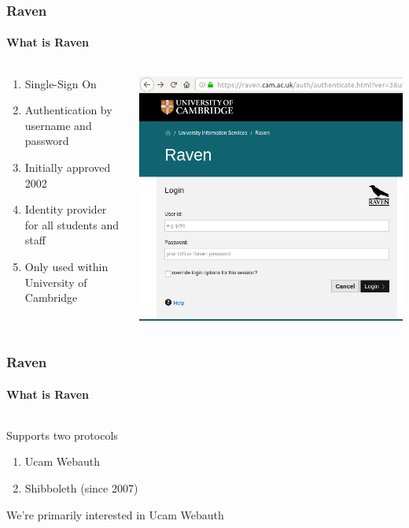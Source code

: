 \documentclass[handout, aspectratio=169, notes=hide]{beamer}
\begin{document}
\begin{frame}
\frametitle{Raven}
\framesubtitle{What is Raven}
\setlength{\parskip}{1.0em}
\centering
\begin{columns}[T]
\begin{column}[T]{0.5\textwidth}
\begin{enumerate}
\setlength{\parskip}{1.0em}
\item Single-Sign On
\item Authentication by username and password
\item Initially approved 2002
\item Identity provider for all students and staff
\item Only used within University of Cambridge
\end{enumerate}
\end{column}
\begin{column}[T]{0.5\textwidth}
\includegraphics[width=1.0\textwidth,right]{raven-login}
\end{column}
\end{columns}

\end{frame}
\note{
}


\begin{frame}
\frametitle{Raven}
\framesubtitle{What is Raven}
\setlength{\parskip}{1.0em}
\centering
\begin{columns}[T]
\begin{column}[T]{1.0\textwidth}
\setlength{\parskip}{1.0em}
Supports two protocols
\begin{enumerate}
\setlength{\parskip}{1.0em}
\item Ucam Webauth
\item Shibboleth (since 2007)
\end{enumerate}
We're primarily interested in Ucam Webauth
\end{column}
\end{columns}

\end{frame}
\note{
}
\end{document}
